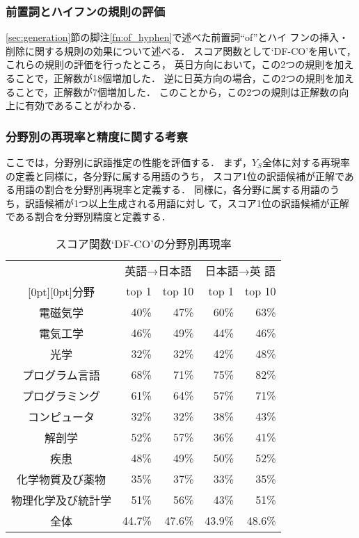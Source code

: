 \documentclass[japanese]{jnlp_1.3a}
\begin{document}
\subsubsection*{前置詞とハイフンの規則の評価}
\ref{sec:generation}節の脚注\ref{fn:of_hyphen}で述べた前置詞``of''とハイ
フンの挿入・削除に関する規則の効果について述べる．
スコア関数として`DF-CO'を用いて，これらの規則の評価を行ったところ，
英日方向において，この2つの規則を加えることで，正解数が18個増加した．
逆に日英方向の場合，この2つの規則を加えることで，正解数が7個増加した．
このことから，この2つの規則は正解数の向上に有効であることがわかる．

\subsubsection*{分野別の再現率と精度に関する考察}



ここでは，分野別に訳語推定の性能を評価する．
まず，$Y_S$全体に対する再現率の定義と同様に，各分野に属する用語のうち，
スコア1位の訳語候補が正解である用語の割合を分野別再現率と定義する．
同様に，各分野に属する用語のうち，訳語候補が1つ以上生成される用語に対し
て，スコア1位の訳語候補が正解である割合を分野別精度と定義する．

\begin{table}[b]
 \small
 \centering
 \caption{スコア関数`DF-CO'の分野別再現率}
 \label{tab:category_seikairitsu}
 \begin{tabular}{|c|r|r|r|r|}
  \hline
  & \multicolumn{2}{|c|}{英語→日本語} & \multicolumn{2}{|c|}{日本語→英
  語} \\
      \cline{2-5}
      \raisebox{0.5\normalbaselineskip}[0pt][0pt]{分野} 
	& top 1 & top 10 & top 1 & top 10 \\
  \hline \hline
  電磁気学           & 40\% & 47\% & 60\% & 63\%\\
  電気工学           & 46\% & 49\% & 44\% & 46\%\\
  光学               & 32\% & 32\% & 42\% & 48\%\\
  プログラム言語     & 68\% & 71\% & 75\% & 82\%\\
  プログラミング     & 61\% & 64\% & 57\% & 71\%\\
  コンピュータ       & 32\% & 32\% & 38\% & 43\%\\
  解剖学             & 52\% & 57\% & 36\% & 41\%\\
  疾患               & 48\% & 49\% & 50\% & 52\%\\
  化学物質及び薬物   & 35\% & 37\% & 33\% & 35\%\\
  物理化学及び統計学 & 51\% & 56\% & 43\% & 51\%\\
  \hline
  全体               & 44.7\% & 47.6\% & 43.9\% & 48.6\%\\
  \hline
 \end{tabular}
\end{table}
\end{document}
